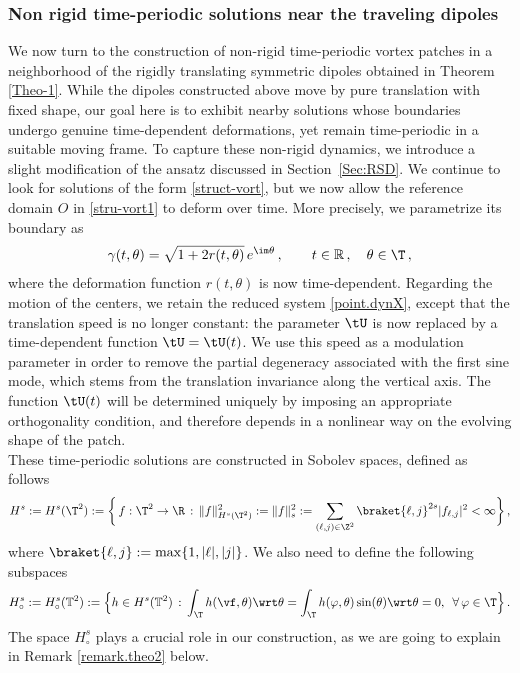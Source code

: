 \documentclass[a4paper,reqno,10pt]{article}
\begin{document}
\subsubsection{Non rigid time-periodic solutions near the traveling  dipoles}
We now turn to the construction of non-rigid time-periodic vortex patches in a neighborhood of the rigidly translating symmetric dipoles obtained in Theorem \ref{Theo-1}. While the dipoles constructed above move by pure translation with fixed shape, our goal here is to exhibit nearby solutions whose boundaries undergo genuine time-dependent deformations, yet remain time-periodic in a suitable moving frame.
To capture these non-rigid dynamics, we introduce a slight modification of the ansatz discussed in Section~\ref{Sec:RSD}. We continue to look for solutions of the form \eqref{struct-vort}, but we now allow the reference domain $O$ in \eqref{stru-vort1} to deform  over time. More precisely, we parametrize its  boundary as
\begin{align}\label{param.gamma02}
\gamma(t,\theta)
=
\sqrt{1 + 2 r(t,\theta)}\, e^{\im \theta}\,,
\qquad
t \in \mathbb{R}\,, \quad \theta \in \T\,,
\end{align}
where the deformation function $r(t,\theta)$ is now time-dependent.
%
Regarding the motion of the centers, we retain the reduced system \eqref{point.dynX}, except that the translation speed is no longer constant: the parameter $\tU$ is now replaced by a time-dependent function $\tU=\tU(t)$. 
We use this speed as a modulation parameter in order to remove the partial degeneracy associated with the first sine mode, which stems from the translation invariance along the vertical axis. The function $\tU(t)$ will be determined uniquely by imposing an appropriate orthogonality condition, and therefore depends in a nonlinear way on the evolving shape of the patch.
%
\\
These time-periodic solutions are constructed in Sobolev spaces, defined as follows
\begin{equation}\label{sob.space.intro}
	H^s:= H^s(\T^2) := \bigg\{\, f:\T^2 \to \R   \, : \, \| f \|_{H^s(\T^2)}^2 :=  \| f \|_{s}^2  := \sum_{(\ell,j)\in \Z^2} \braket{\ell,j}^{2s} |f_{\ell,j}|^2 < \infty  \bigg\}\,,  
\end{equation}
where $\braket{\ell,j}:= \max\{ 1, |\ell|, |j| \}$. We also need to define the following subspaces
\begin{equation}
     H_\circ^{s}:=H_{\circ}^{s}(\mathbb{T}^{2}):=\Big\{ h\in H^{s}(\mathbb{T}^{2})  \, : \, \int_{\T} h(\vf,\theta) \wrt\theta = \int_{\T}h(\varphi,\theta)\sin(\theta)\wrt\theta=0,\, \ \forall\,\varphi\in\T \Big\}\,. \label{Hcirc.def.intro}
\end{equation}
The space $H_\circ^{s}$ plays a crucial role in our construction, as we are going to explain in Remark \ref{remark.theo2} below.
\end{document}
